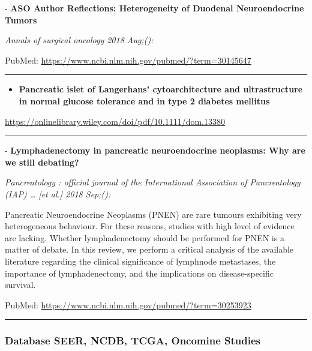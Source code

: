 \documentclass[]{article}
\providecommand{\tightlist}{%
  \setlength{\itemsep}{0pt}\setlength{\parskip}{0pt}}
\begin{document}
 - \textbf{ASO Author Reflections: Heterogeneity of Duodenal
Neuroendocrine Tumors}

\emph{Annals of surgical oncology 2018 Aug;():}

PubMed: \url{https://www.ncbi.nlm.nih.gov/pubmed/?term=30145647}

{}

{}

\begin{center}\rule{0.5\linewidth}{\linethickness}\end{center}

\begin{itemize}
\tightlist
\item
  \textbf{Pancreatic islet of Langerhans' cytoarchitecture and
  ultrastructure in normal glucose tolerance and in type 2 diabetes
  mellitus}
\end{itemize}

\url{https://onlinelibrary.wiley.com/doi/pdf/10.1111/dom.13380}

\begin{center}\rule{0.5\linewidth}{\linethickness}\end{center}

 - \textbf{Lymphadenectomy in pancreatic neuroendocrine neoplasms: Why
are we still debating?}

\emph{Pancreatology : official journal of the International Association
of Pancreatology (IAP) \ldots{} {[}et al.{]} 2018 Sep;():}

Pancreatic Neuroendocrine Neoplasms (PNEN) are rare tumours exhibiting
very heterogeneous behaviour. For these reasons, studies with high level
of evidence are lacking. Whether lymphadenectomy should be performed for
PNEN is a matter of debate. In this review, we perform a critical
analysis of the available literature regarding the clinical significance
of lymphnode metastases, the importance of lymphadenectomy, and the
implications on disease-specific survival.

PubMed: \url{https://www.ncbi.nlm.nih.gov/pubmed/?term=30253923}

{}

{}

\begin{center}\rule{0.5\linewidth}{\linethickness}\end{center}

\hypertarget{database-seer-ncdb-tcga-oncomine-studies}{%
\subsubsection{Database SEER, NCDB, TCGA, Oncomine
Studies}\label{database-seer-ncdb-tcga-oncomine-studies}}
\end{document}
